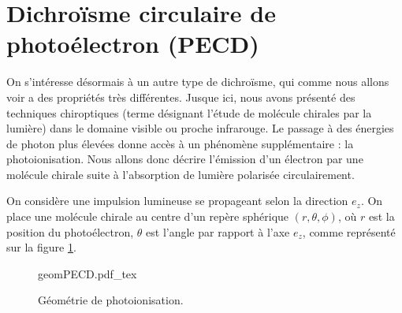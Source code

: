 \section{Dichroïsme circulaire de photoélectron (PECD)}
\label{sec:PECD}
On s'intéresse désormais à un autre type de dichroïsme, qui comme nous allons voir a des propriétés très différentes. Jusque ici, nous avons présenté des techniques chiroptiques (terme désignant l'étude de molécule chirales par la lumière) dans le domaine visible ou proche infrarouge. Le passage à des énergies de photon plus élevées donne accès à un phénomène supplémentaire : la photoionisation. Nous allons donc décrire l'émission d'un électron par une molécule chirale suite à l'absorption de lumière polarisée circulairement. 

On considère une impulsion lumineuse se propageant selon la direction $e_z$. On place une molécule chirale au centre d'un repère sphérique $(r,\theta,\phi)$, où $r$ est la position du photoélectron, $\theta$ est l'angle par rapport à l'axe $e_z$, comme représenté sur la figure \ref{fig:geomPECD}.

\begin{figure}[!ht]
\centering
\def\svgwidth{0.5\columnwidth}
{geomPECD.pdf_tex}
\caption{Géométrie de photoionisation.}
\label{fig:geomPECD}
\end{figure}

